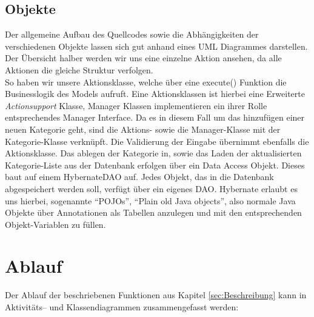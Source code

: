 \documentclass[12pt,a4paper]{article}
\begin{document}
	\subsection{Objekte}
	Der allgemeine Aufbau des Quellcodes sowie die Abhängigkeiten der verschiedenen Objekte lassen sich gut anhand eines UML Diagrammes darstellen. Der Übersicht halber werden wir uns eine einzelne Aktion ansehen, da alle Aktionen die gleiche Struktur verfolgen.\\
	So haben wir unsere Aktionsklasse, welche über eine execute() Funktion die Businesslogik des Models aufruft. Eine Aktionsklassen ist hierbei eine Erweiterte \textit{Actionsupport} Klasse, Manager Klassen implementieren ein ihrer Rolle entsprechendes Manager Interface. Da es in diesem Fall um das hinzufügen einer neuen Kategorie geht, sind die Aktions- sowie die Manager-Klasse mit der Kategorie-Klasse verknüpft. Die Validierung der Eingabe übernimmt ebenfalls die Aktionsklasse.
	Das ablegen der Kategorie in, sowie das Laden der aktualisierten Kategorie-Liste aus der Datenbank erfolgen über ein Data Access Objekt. Dieses baut auf einem HybernateDAO auf. Jedes Objekt, das in die Datenbank abgespeichert werden soll, verfügt über ein eigenes DAO. Hybernate erlaubt es uns hierbei, sogenannte "`POJOs"', "`Plain old Java objects"', also normale Java Objekte über Annotationen als Tabellen anzulegen und mit den entsprechenden Objekt-Variablen zu füllen.
	\begin{center}
	\end{center}

	
	\section{Ablauf}
	Der Ablauf der beschriebenen Funktionen aus Kapitel \ref{sec:Beschreibung} kann in  Aktivitäts-- und Klassendiagrammen zusammengefasst werden:
	
\end{document}
